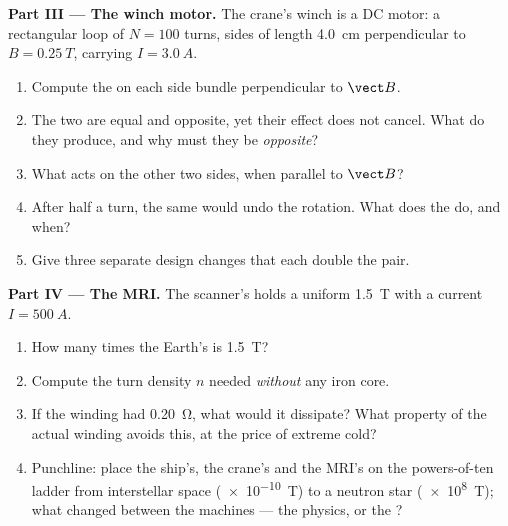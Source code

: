 \begin{problem}
\medskip
\noindent\textbf{Part III --- The winch motor.}
The crane's winch is a DC motor: a rectangular loop of $N = 100$ turns,
sides of length \qty{4.0}{cm} perpendicular to $B = \qty{0.25}{T}$,
carrying $I = \qty{3.0}{A}$.
\begin{enumerate}[resume]
  \item Compute the  on each side bundle perpendicular to $\vect B$.
  \item The two  are equal and opposite, yet their effect does not
        cancel. What do they produce, and why must they be \emph{opposite}?
  \item What  acts on the other two sides, when parallel to $\vect B$?
  \item After half a turn, the same  would undo the rotation.
        What does the  do, and when?
  \item Give three separate design changes that each double the  pair.
\end{enumerate}

\medskip
\noindent\textbf{Part IV --- The MRI.}
The scanner's  holds a uniform \qty{1.5}{T} with a current
$I = \qty{500}{A}$.
\begin{enumerate}[resume]
  \item How many times the Earth's  is \qty{1.5}{T}?
  \item Compute the turn density $n$ needed \emph{without} any iron core.
  \item If the winding had  \qty{0.20}{\ohm}, what 
        would it dissipate? What property of the actual winding avoids
        this, at the price of extreme cold?
  \item Punchline: place the ship's, the crane's and the MRI's 
        on the powers-of-ten ladder from interstellar space
        (\qty{e-10}{T}) to a neutron star (\qty{e8}{T}); what changed
        between the machines --- the physics, or the ?
\end{enumerate}
\end{problem}

